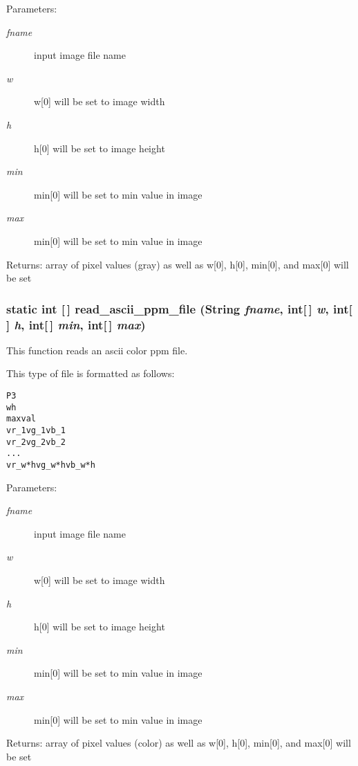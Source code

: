\begin{Desc}
\item[Parameters:]
\begin{description}
\item[{\em fname}]input image file name \item[{\em w}]w[0] will be set to image width \item[{\em h}]h[0] will be set to image height \item[{\em min}]min[0] will be set to min value in image \item[{\em max}]min[0] will be set to min value in image\end{description}
\end{Desc}
\begin{Desc}
\item[Returns:]array of pixel values (gray) as well as w[0], h[0], min[0], and max[0] will be set \end{Desc}
\subsubsection{\setlength{\rightskip}{0pt plus 5cm}static int [$\,$] read\_\-ascii\_\-ppm\_\-file (String {\em fname}, int[$\,$] {\em w}, int[$\,$] {\em h}, int[$\,$] {\em min}, int[$\,$] {\em max})\hspace{0.3cm}{\tt  [static, protected]}}\label{class_c_s_image_viewer_1_1pnm_helper_d720e5b006c12f016e792ac0c70ba806}


This function reads an ascii color ppm file. 

This type of file is formatted as follows: \small\begin{alltt}
    P3
    w h
    maxval
    vr\_1 vg\_1 vb\_1
    vr\_2 vg\_2 vb\_2
    . . .
    vr\_w*h vg\_w*h vb\_w*h
  \end{alltt}\normalsize 


\begin{Desc}
\item[Parameters:]
\begin{description}
\item[{\em fname}]input image file name \item[{\em w}]w[0] will be set to image width \item[{\em h}]h[0] will be set to image height \item[{\em min}]min[0] will be set to min value in image \item[{\em max}]min[0] will be set to min value in image\end{description}
\end{Desc}
\begin{Desc}
\item[Returns:]array of pixel values (color) as well as w[0], h[0], min[0], and max[0] will be set \end{Desc}
